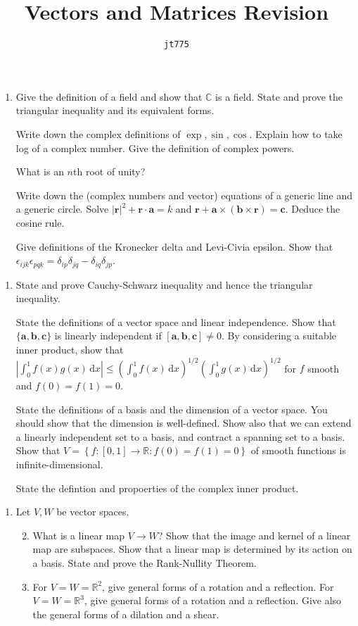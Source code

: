 \documentclass[11pt]{article}
\title{\textbf{Vectors and Matrices Revision}}
\author{\texttt{jt775}}
\date{\null}
\newcommand{\bbC}{\mathbb{C}}
\newlength{\qspace}
\newcounter{qnumber}
\newenvironment{question}%
 {\vspace{\qspace}
  \begin{enumerate}[\bfseries 1\quad][10]%
    \setcounter{enumi}{\value{qnumber}}%
    \item%
 }
{
  \end{enumerate}
  \filbreak
  \stepcounter{qnumber}
 }
\newenvironment{questionparts}[1][1]%
 {
  \begin{enumerate}[\bfseries (i)]%
    \setcounter{enumii}{#1}
    \addtocounter{enumii}{-1}
    \setlength{\parskip}{3pt}
 }
 {
  \end{enumerate}
 }
\def\le{\leqslant}
\begin{document}
\maketitle
\vspace{-1.5cm}
\begin{question}
    Give the definition of a field and show that $\bbC$ is a field. State and prove the triangular inequality and its equivalent forms.

    Write down the complex definitions of $ \exp, \sin, \cos $. Explain how to take log of a complex number. Give the definition of complex powers.

    What is an $n$th root of unity?

    Write down the (complex numbers and vector) equations of a generic line and a generic circle. Solve $ |\mathbf{r}|^2+\mathbf{r}\cdot \mathbf{a}=k $ and $ \mathbf{r}+\mathbf{a} \times (\mathbf{b}\times \mathbf{r}) =\mathbf{c} $. Deduce the cosine rule.

    Give definitions of the Kronecker delta and Levi-Civia epsilon. Show that $ \epsilon_{ijk}\epsilon_{pqk}= \delta_{ip}\delta_{jq}-\delta_{iq}\delta_{jp}$.
\end{question}
\begin{question}
  State and prove Cauchy-Schwarz inequality and hence the triangular inequality.

  State the definitions of a vector space and linear independence. Show that $ \{\mathbf{a},\mathbf{b},\mathbf{c}\} $ is linearly independent if $ [\mathbf{a},\mathbf{b},\mathbf{c}]\neq 0 $. By considering a suitable inner product, show that $ \left| \int_{0}^{1} f(x)g(x) \,\mathrm{d}x \right| \le \left( \int_{0}^{1} f(x) \,\mathrm{d}x \right)^{1/2}\left( \int_{0}^{1} g(x) \,\mathrm{d}x \right)^{1/2} $ for $f$ smooth and $ f(0)=f(1)=0 $.

  State the definitions of a basis and the dimension of a vector space. You should show that the dimension is well-defined. Show also that we can extend a linearly independent set to a basis, and contract a spanning set to a basis. Show that $ V=\left\{ f:[0,1] \to \mathbb{R} :f(0)=f(1)=0\right\} $ of smooth functions is infinite-dimensional.

  State the defintion and propoerties of the complex inner product.
\end{question}
\begin{question}
  Let $ V,W $ be vector spaces.
  \begin{questionparts}
    \item What is a linear map $ V \to W $? Show that the image and kernel of a linear map are subspaces. Show that a linear map is determined by its action on a basis. State and prove the Rank-Nullity Theorem.
    \item For $ V=W=\mathbb{R}^2 $, give general forms of a rotation and a reflection. For $ V=W=\mathbb{R}^{3} $, give general forms of a rotation and a reflection. Give also the general forms of a dilation and a shear.
  \end{questionparts}
\end{question}
\end{document}
